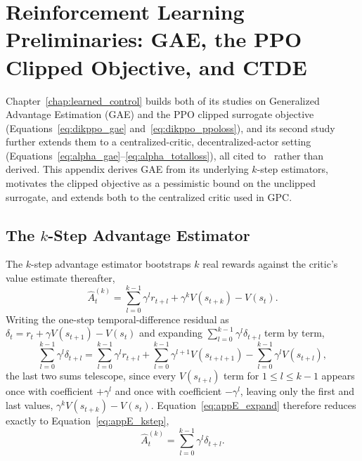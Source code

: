 \chapter{Reinforcement Learning Preliminaries: GAE, the PPO Clipped Objective, and CTDE}
\label{app:rl}

Chapter~\ref{chap:learned_control} builds both of its studies on Generalized Advantage Estimation
(GAE) and the PPO clipped surrogate objective (Equations~\eqref{eq:dikppo_gae}
and~\eqref{eq:dikppo_ppoloss}), and its second study further extends them to a centralized-critic,
decentralized-actor setting (Equations~\eqref{eq:alpha_gae}--\eqref{eq:alpha_totalloss}), all cited
to~\citep{schulman2017proximal,yu2022surprising} rather than derived. This appendix derives GAE from
its underlying $k$-step estimators, motivates the clipped objective as a pessimistic bound on the
unclipped surrogate, and extends both to the centralized critic used in GPC.

\section{The \texorpdfstring{$k$}{k}-Step Advantage Estimator}\label{sec:appE_kstep}

The $k$-step advantage estimator bootstraps $k$ real rewards against the critic's value estimate
thereafter,
\begin{equation}
\hat{A}_t^{(k)} = \sum_{l=0}^{k-1}\gamma^l r_{t+l} + \gamma^k V(s_{t+k}) - V(s_t).
\label{eq:appE_kstep}
\end{equation}
Writing the one-step temporal-difference residual as $\delta_t = r_t + \gamma V(s_{t+1}) - V(s_t)$
and expanding $\sum_{l=0}^{k-1}\gamma^l\delta_{t+l}$ term by term,
\begin{equation}
\sum_{l=0}^{k-1}\gamma^l\delta_{t+l} = \sum_{l=0}^{k-1}\gamma^l r_{t+l}
+ \sum_{l=0}^{k-1}\gamma^{l+1}V(s_{t+l+1}) - \sum_{l=0}^{k-1}\gamma^l V(s_{t+l}),
\label{eq:appE_expand}
\end{equation}
the last two sums telescope, since every $V(s_{t+l})$ term for $1\leq l\leq k-1$ appears once with
coefficient $+\gamma^l$ and once with coefficient $-\gamma^l$, leaving only the first and last
values, $\gamma^kV(s_{t+k}) - V(s_t)$. Equation~\eqref{eq:appE_expand} therefore reduces exactly to
Equation~\eqref{eq:appE_kstep},
\begin{equation}
\hat{A}_t^{(k)} = \sum_{l=0}^{k-1}\gamma^l\delta_{t+l}.
\label{eq:appE_kstepdelta}
\end{equation}


